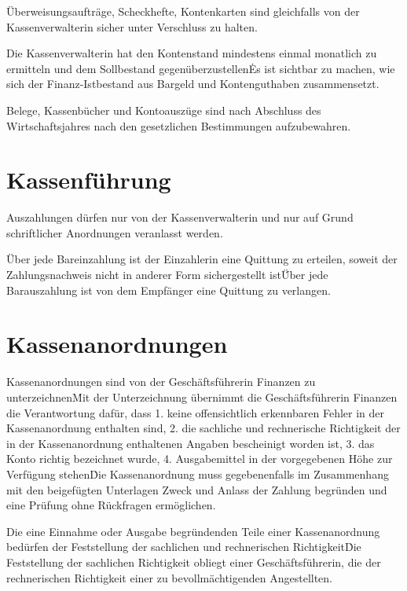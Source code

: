 {\begin{multicols}{2}
\Abs \Satz Überweisungsaufträge, Scheckhefte, Kontenkarten sind gleichfalls von der Kassenverwalterin sicher unter Verschluss zu halten.

\Abs \Satz Die Kassenverwalterin hat den Kontenstand mindestens einmal monatlich zu ermitteln und dem Sollbestand gegenüberzustellen\. Es ist sichtbar zu machen, wie sich der Finanz-Istbestand aus Bargeld und Kontenguthaben zusammensetzt.

\Abs \Satz Belege, Kassenbücher und Kontoauszüge sind nach Abschluss des Wirtschaftsjahres nach den gesetzlichen Bestimmungen aufzubewahren.



\section{Kassenführung}

\Abs \Satz Auszahlungen dürfen nur von der Kassenverwalterin und nur auf Grund schriftlicher Anordnungen veranlasst werden.

\Abs \Satz Über jede Bareinzahlung ist der Einzahlerin eine Quittung zu erteilen, soweit der Zahlungsnachweis nicht in anderer Form sichergestellt ist\. Über jede Barauszahlung ist von dem Empfänger eine Quittung zu verlangen.



\section{Kassenanordnungen}

\Abs \Satz Kassenanordnungen sind von der Geschäftsführerin Finanzen zu unterzeichnen\. Mit der Unterzeichnung übernimmt die Geschäftsführerin Finanzen die Verantwortung dafür, dass
1. keine offensichtlich erkennbaren Fehler in der Kassenanordnung enthalten sind,
2. die sachliche und rechnerische Richtigkeit der in der Kassenanordnung enthaltenen Angaben bescheinigt worden ist,
3. das Konto richtig bezeichnet wurde,
4. Ausgabemittel in der vorgegebenen Höhe zur Verfügung stehen\.
Die Kassenanordnung muss gegebenenfalls im Zusammenhang mit den beigefügten Unterlagen Zweck und Anlass der Zahlung begründen und eine Prüfung ohne Rückfragen ermöglichen.

\Abs \Satz Die eine Einnahme oder Ausgabe begründenden Teile einer Kassenanordnung bedürfen der Feststellung der sachlichen und rechnerischen Richtigkeit\. Die Feststellung der sachlichen Richtigkeit obliegt einer Geschäftsführerin, die der rechnerischen Richtigkeit einer zu bevollmächtigenden Angestellten.




\end{multicols}}
